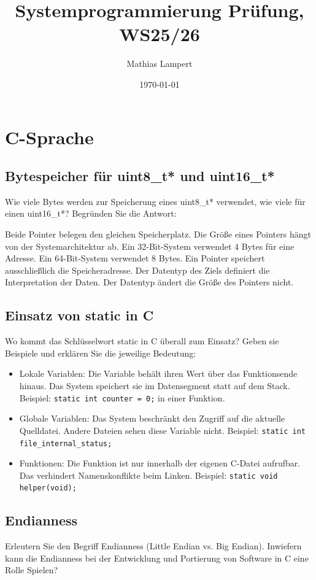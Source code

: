 \documentclass[12pt,a4paper]{article}
\title{Systemprogrammierung Prüfung, WS25/26}
\author{Mathias Lampert}
\date{\today}
\begin{document}
\maketitle
\tableofcontents
\newpage

\section{C-Sprache}

\subsection{Bytespeicher für uint8\_t* und uint16\_t*}
Wie viele Bytes werden zur Speicherung eines uint8\_t* verwendet, wie viele für einen uint16\_t*? Begründen Sie die Antwort:

Beide Pointer belegen den gleichen Speicherplatz. Die Größe eines Pointers hängt von der Systemarchitektur ab. Ein 32-Bit-System verwendet 4 Bytes für eine Adresse. Ein 64-Bit-System verwendet 8 Bytes. Ein Pointer speichert ausschließlich die Speicheradresse. Der Datentyp des Ziels definiert die Interpretation der Daten. Der Datentyp ändert die Größe des Pointers nicht.

\subsection{Einsatz von static in C}
Wo kommt das Schlüsselwort static in C überall zum Einsatz? Geben sie Beispiele und erklären Sie die jeweilige Bedeutung:
\begin{itemize}
    \item Lokale Variablen: Die Variable behält ihren Wert über das Funktionsende hinaus. Das System speichert sie im Datensegment statt auf dem Stack. Beispiel: \texttt{static int counter = 0;} in einer Funktion.
    \item Globale Variablen: Das System beschränkt den Zugriff auf die aktuelle Quelldatei. Andere Dateien sehen diese Variable nicht. Beispiel: \texttt{static int file\_internal\_status;}
    \item Funktionen: Die Funktion ist nur innerhalb der eigenen C-Datei aufrufbar. Das verhindert Namenskonflikte beim Linken. Beispiel: \texttt{static void helper(void);}
\end{itemize}

\subsection{Endianness}
Erleutern Sie den Begriff Endianness (Little Endian vs. Big Endian). Inwiefern kann die Endianness bei der Entwicklung und Portierung von Software in C eine Rolle Spielen?
\end{document}
